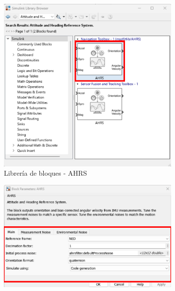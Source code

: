 \begin{figure}[htbp]
    \centering
    \begin{subfigure}[b]{0.35\textwidth}
        \centering
        \includegraphics[width=\textwidth]{fig/Capitulo5/Caso_de_estudio_IMU/Generador_de_salidas/libreira_de_bloques_sensor_AHRS.pdf}
        \caption{Librería de bloques - AHRS}
        \label{fig:lib_bloques_AHRS}
    \end{subfigure}
    \hfill
    \begin{subfigure}[b]{0.45\textwidth}
        \centering
        \includegraphics[width=\textwidth]{fig/Capitulo5/Caso_de_estudio_IMU/Generador_de_salidas/configuracion_AHRS_01.pdf}

\end{subfigure}
\end{figure}
